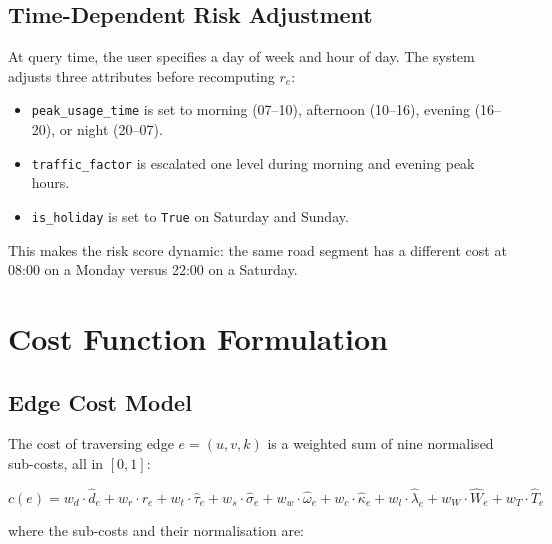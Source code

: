﻿\documentclass[a4paper, 12pt]{article}
\theoremstyle{remark}
\begin{document}
\subsection{Time-Dependent Risk Adjustment}

At query time, the user specifies a day of week and hour of day. The system adjusts three attributes before recomputing $r_e$:
\begin{itemize}
    \item \texttt{peak\_usage\_time} is set to morning (07--10), afternoon (10--16), evening (16--20), or night (20--07).
    \item \texttt{traffic\_factor} is escalated one level during morning and evening peak hours.
    \item \texttt{is\_holiday} is set to \texttt{True} on Saturday and Sunday.
\end{itemize}
This makes the risk score dynamic: the same road segment has a different cost at 08:00 on a Monday versus 22:00 on a Saturday.


\section{Cost Function Formulation}

\subsection{Edge Cost Model}

The cost of traversing edge $e = (u, v, k)$ is a weighted sum of nine normalised sub-costs, all in $[0, 1]$:

\begin{equation}
c(e) = w_d \cdot \hat{d}_e
     + w_r \cdot r_e
     + w_t \cdot \hat{\tau}_e
     + w_s \cdot \hat{\sigma}_e
     + w_w \cdot \hat{\omega}_e
     + w_c \cdot \hat{\kappa}_e
     + w_l \cdot \hat{\lambda}_e
     + w_W \cdot \hat{W}_e
     + w_T \cdot \hat{T}_e
\label{eq:cost}
\end{equation}

where the sub-costs and their normalisation are:
\end{document}
